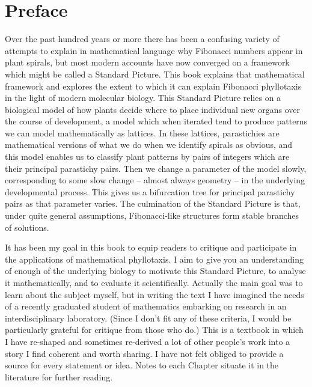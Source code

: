 

\chapter*{Preface}


Over the past hundred years or more there has been a confusing variety of attempts to explain in mathematical language why Fibonacci numbers appear in plant spirals, but most modern accounts have now converged on a framework which might be called a Standard Picture. This book explains that mathematical framework and explores the extent to which it can explain Fibonacci phyllotaxis in the light of modern molecular biology.
 This Standard Picture relies on a biological model of how plants decide where to place individual new  organs over the course of development,
a model which when iterated tend to produce patterns we can model mathematically as lattices. In these lattices, parastichies are mathematical versions of what we do when we identify spirals as obvious, and this model enables us to classify plant patterns by pairs of integers which are their principal parastichy pairs. Then we change a parameter of the model slowly, corresponding to some slow change -- almost always geometry -- in the underlying developmental process. This gives us a bifurcation tree for principal parastichy pairs as that parameter varies. The culmination of the Standard Picture is that, under quite general assumptions, Fibonacci-like structures form  stable branches of solutions.

It has been my goal in this book to equip readers to critique and participate in the applications of mathematical phyllotaxis.  I aim to give you an understanding of enough of the underlying biology to motivate this Standard Picture, to analyse it mathematically, and to evaluate it scientifically. Actually the main goal was to learn about the subject myself, but in writing the text I have imagined the needs of a recently graduated student of mathematics embarking on research in an interdisciplinary laboratory. (Since I don't fit any of these criteria, I would be particularly grateful for critique from those who do.) This is a textbook in which I have re-shaped and sometimes  re-derived a lot of other people's work into a story I find coherent and worth sharing. I have not felt obliged to provide a source for every statement or idea. Notes to each Chapter situate it in the literature for further reading. 



